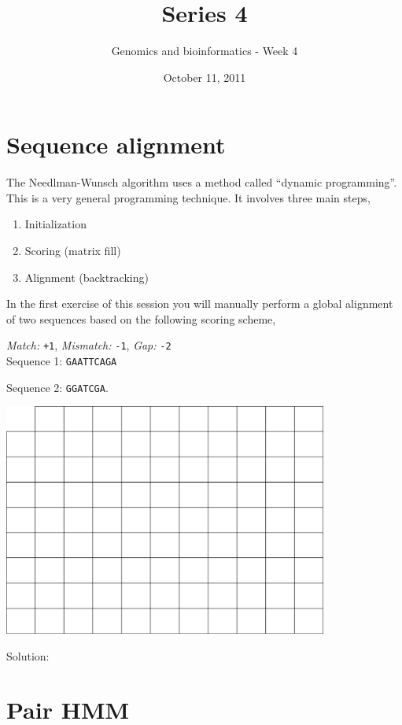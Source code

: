 \documentclass[a4paper,11pt]{article}
\title{Series 4}
\date{October 11, 2011}
\author{Genomics and bioinformatics - Week 4}
\begin{document}
\maketitle

\section{Sequence alignment}
The Needlman-Wunsch algorithm uses a method called ``dynamic programming''. This is a very general programming technique. It involves three main steps,
\begin{enumerate}
\item Initialization
\item Scoring (matrix fill)
\item Alignment (backtracking)
\end{enumerate}

In the first exercise of this session you will manually perform a global alignment of two sequences based on the following scoring scheme,

\emph{Match:} \texttt{+1}, \emph{Mismatch:} \texttt{-1}, \emph{Gap:} \texttt{-2}\\

Sequence 1: \texttt{GAATTCAGA}

Sequence 2: \texttt{GGATCGA}.

\begin{center}
\includegraphics[width=0.8\textwidth]{matrix.png}
\end{center}

Solution:\\

\section{Pair HMM}
\end{document}
